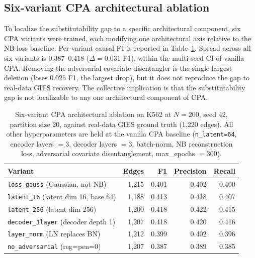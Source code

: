 \documentclass{article}
\theoremstyle{plain}
\theoremstyle{definition}
\theoremstyle{remark}
\begin{document}
\subsection{Six-variant CPA architectural ablation}
\label{app:cpa_ablation}

To localize the substitutability gap to a specific architectural component, six CPA variants were trained, each modifying one architectural axis relative to the NB-loss baseline. Per-variant causal F1 is reported in Table~\ref{tab:ablation_cpa}. Spread across all six variants is $0.387$--$0.418$ ($\Delta = 0.031$ F1), within the multi-seed CI of vanilla CPA. Removing the adversarial covariate disentangler is the single largest deletion (loses $0.025$ F1, the largest drop), but it does not reproduce the gap to real-data GIES recovery. The collective implication is that the substitutability gap is not localizable to any one architectural component of CPA.

\begin{table}[h]
\centering
\small
\begin{tabular}{lrrrr}
\toprule
\textbf{Variant} & \textbf{Edges} & \textbf{F1} & \textbf{Precision} & \textbf{Recall} \\
\midrule
\texttt{loss\_gauss}\,\,(Gaussian, not NB)        & 1{,}215 & 0.401 & 0.402 & 0.400 \\
\texttt{latent\_16}\,\,(latent dim 16, base 64)  & 1{,}188 & 0.413 & 0.418 & 0.407 \\
\texttt{latent\_256}\,\,(latent dim 256)         & 1{,}200 & 0.418 & 0.422 & 0.415 \\
\texttt{decoder\_1layer}\,\,(decoder depth 1)    & 1{,}207 & 0.418 & 0.420 & 0.416 \\
\texttt{layer\_norm}\,\,(LN replaces BN)         & 1{,}212 & 0.399 & 0.402 & 0.396 \\
\texttt{no\_adversarial}\,\,(reg=pen=0)          & 1{,}207 & 0.387 & 0.389 & 0.385 \\
\bottomrule
\end{tabular}
\caption{Six-variant CPA architectural ablation on K562 at $N{=}200$, seed 42, partition size 20, against real-data GIES ground truth (1{,}220 edges). All other hyperparameters are held at the vanilla CPA baseline (\texttt{n\_latent=64}, encoder layers $=3$, decoder layers $=3$, batch-norm, NB reconstruction loss, adversarial covariate disentanglement, max\_epochs $=300$).}
\label{tab:ablation_cpa}
\end{table}
\end{document}
